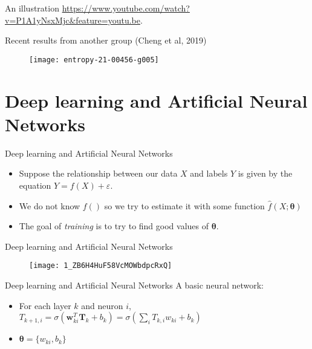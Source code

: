 \documentclass{beamer}
\begin{document}
\begin{frame}{An illustration}
	\url{https://www.youtube.com/watch?v=P1A1yNsxMjc&feature=youtu.be}. 
\end{frame}

\begin{frame}{Recent results from another group (Cheng et al, 2019)}
\begin{figure}
	\centering
	\texttt{[image: entropy-21-00456-g005]}
	\label{fig:entropy-21-00456-g005}
\end{figure}
\end{frame}


\section{Deep learning and Artificial Neural Networks}
\begin{frame}{Deep learning and Artificial Neural Networks}
\begin{itemize}
	\item Suppose the relationship between our data $X$ and labels $Y$ is given by the equation $Y = f(X) + \varepsilon$. 
	\item We do not know $f()$ so we try to estimate it with some function $\hat{f}(X; \boldsymbol{\theta})$
	\item The goal of \emph{training} is to try to find good values of $\boldsymbol{\theta}$. 
\end{itemize}
\end{frame}

\begin{frame}{Deep learning and Artificial Neural Networks}
\begin{figure}
	\centering
	\texttt{[image: 1\_ZB6H4HuF58VcMOWbdpcRxQ]}
	\label{fig:1zb6h4huf58vcmowbdpcrxq}
\end{figure}
\end{frame}

\begin{frame}{Deep learning and Artificial Neural Networks}
A basic neural network: 
\begin{itemize}
	\item For each layer $k$ and neuron $i$, $T_{k+1,i} = \sigma(\boldsymbol{w}_{ki}^T \boldsymbol{T}_{k} + b_k)
		 = \sigma\left (\sum\limits_{i} T_{k,i} w_{ki} + b_k \right)$
	\item $\boldsymbol{\theta} = \{ w_{ki}, b_k \}$
\end{itemize}
\end{frame}
\end{document}
